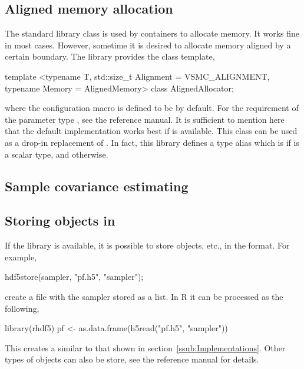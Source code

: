 \documentclass[11pt,bib,mint,hyper,altcolor]{marticle}
\begin{document}
\subsection{Aligned memory allocation}
\label{sub:Aligned memory allocation}

The standard library class  is used by containers to
allocate memory. It works fine in most cases. However, sometime it is desired
to allocate memory aligned by a certain boundary. The library provides the
class template,
\begin{cppcode}
  template <typename T, std::size_t Alignment = VSMC_ALIGNMENT,
  typename Memory = AlignedMemory>
  class AlignedAllocator;
\end{cppcode}
where the configuration macro  is defined to be
 by default. For the requirement of the parameter type
, see the reference manual. It is sufficient to mention here
that the default implementation works best if \tbb is available. This class can
be used as a drop-in replacement of . In fact,
this library defines a type alias  which is
 if  is a scalar
type, and  otherwise.

\subsection{Sample covariance estimating}
\label{sub:Sample covariance estimating}

\subsection{Storing objects in \protect\hdf}
\label{sub:Storing objects in hdf}

If the \hdf library is available, it is possible to store
 objects, etc., in the \hdf format. For example,
\begin{cppcode}
  hdf5store(sampler, "pf.h5", "sampler");
\end{cppcode}
create a \hdf file with the sampler stored as a list. In R it can be processed
as the following,
\begin{rcode}
  library(rhdf5)
  pf <- as.data.frame(h5read("pf.h5", "sampler"))
\end{rcode}
This creates a  similar to that shown in
section~\ref{ssub:Implementations}. Other types of objects can also be store,
see the reference manual for details.
\end{document}
